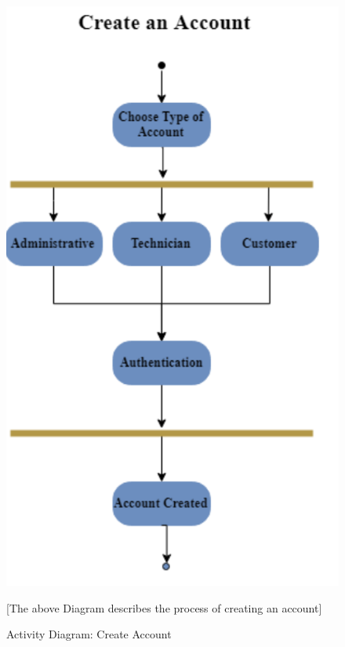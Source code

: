 \documentclass[letterpaper]{article}
\begin{document}
\begin{figure}[htbp]
  \includegraphics[]{AD_CreateAcc}
  \caption{Activity Diagram: Create Account}[The above Diagram describes the process of creating an account]
  \centering
\end{figure}
\end{document}
